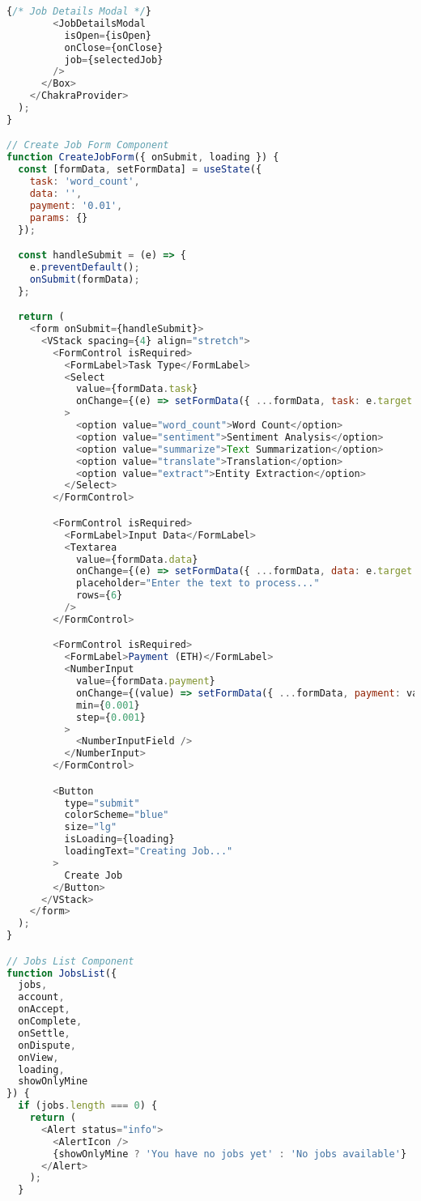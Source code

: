 \begin{lstlisting}[language=JavaScript,caption={App.jsx - Main React Application}]
        {/* Job Details Modal */}
        <JobDetailsModal 
          isOpen={isOpen}
          onClose={onClose}
          job={selectedJob}
        />
      </Box>
    </ChakraProvider>
  );
}

// Create Job Form Component
function CreateJobForm({ onSubmit, loading }) {
  const [formData, setFormData] = useState({
    task: 'word_count',
    data: '',
    payment: '0.01',
    params: {}
  });

  const handleSubmit = (e) => {
    e.preventDefault();
    onSubmit(formData);
  };

  return (
    <form onSubmit={handleSubmit}>
      <VStack spacing={4} align="stretch">
        <FormControl isRequired>
          <FormLabel>Task Type</FormLabel>
          <Select 
            value={formData.task}
            onChange={(e) => setFormData({ ...formData, task: e.target.value })}
          >
            <option value="word_count">Word Count</option>
            <option value="sentiment">Sentiment Analysis</option>
            <option value="summarize">Text Summarization</option>
            <option value="translate">Translation</option>
            <option value="extract">Entity Extraction</option>
          </Select>
        </FormControl>

        <FormControl isRequired>
          <FormLabel>Input Data</FormLabel>
          <Textarea
            value={formData.data}
            onChange={(e) => setFormData({ ...formData, data: e.target.value })}
            placeholder="Enter the text to process..."
            rows={6}
          />
        </FormControl>

        <FormControl isRequired>
          <FormLabel>Payment (ETH)</FormLabel>
          <NumberInput 
            value={formData.payment}
            onChange={(value) => setFormData({ ...formData, payment: value })}
            min={0.001}
            step={0.001}
          >
            <NumberInputField />
          </NumberInput>
        </FormControl>

        <Button
          type="submit"
          colorScheme="blue"
          size="lg"
          isLoading={loading}
          loadingText="Creating Job..."
        >
          Create Job
        </Button>
      </VStack>
    </form>
  );
}

// Jobs List Component
function JobsList({ 
  jobs, 
  account, 
  onAccept, 
  onComplete, 
  onSettle, 
  onDispute, 
  onView,
  loading,
  showOnlyMine 
}) {
  if (jobs.length === 0) {
    return (
      <Alert status="info">
        <AlertIcon />
        {showOnlyMine ? 'You have no jobs yet' : 'No jobs available'}
      </Alert>
    );
  }


\end{lstlisting}
